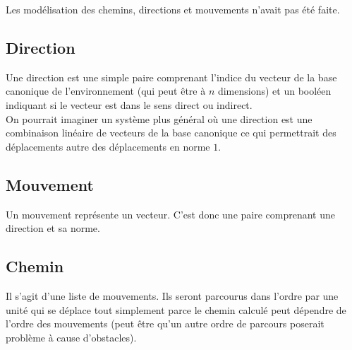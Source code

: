 Les modélisation des chemins, directions et mouvements n'avait pas été faite.

\subsection{Direction}

Une direction est une simple paire comprenant l'indice du vecteur de la base canonique de l'environnement (qui peut être à $n$ dimensions) et un booléen indiquant si le vecteur est dans le sens direct ou indirect.\\
On pourrait imaginer un système plus général où une direction est une combinaison linéaire de vecteurs de la base canonique ce qui permettrait des déplacements autre des déplacements en norme $1$.

\subsection{Mouvement}
Un mouvement représente un vecteur. C'est donc une paire comprenant une direction et sa norme.

\subsection{Chemin}

Il s'agit d'une liste de mouvements. Ils seront parcourus dans l'ordre par une unité qui se déplace tout simplement parce le chemin calculé peut dépendre de l'ordre des mouvements (peut être qu'un autre ordre de parcours poserait problème à cause d'obstacles).


